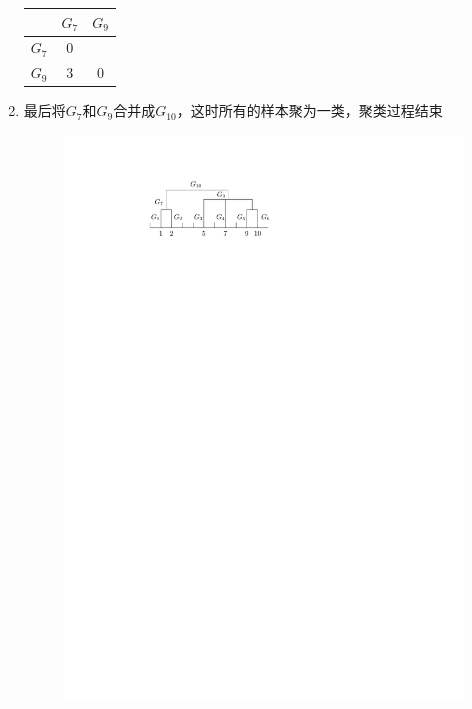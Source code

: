 \begin{example}
\begin{enumerate}
\begin{table}[htbp]
\begin{tabular}{c|cc}
                & $G_7$ & $G_9$ \bigstrut\\
            \hline
            $G_7$ & 0   &  \bigstrut[t]\\
            $G_9$ & 3   & 0 \bigstrut[b]\\
            \hline
            \end{tabular}%
        \end{table}%
        \item 最后将$G_7$和$G_9$合并成$G_{10}$，这时所有的样本聚为一类，聚类过程结束
        \begin{figure}
            \centering
            \includegraphics{image/层次聚类举例可视化.pdf}
        \end{figure}
    \end{enumerate}
\end{example}
